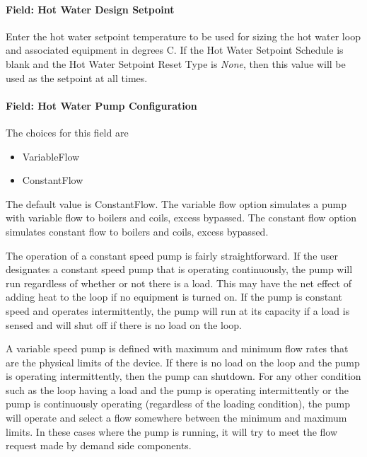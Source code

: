 \paragraph{Field: Hot Water Design Setpoint}\label{field-hot-water-design-setpoint}

Enter the hot water setpoint temperature to be used for sizing the hot water loop and associated equipment in degrees C. If the Hot Water Setpoint Schedule is blank and the Hot Water Setpoint Reset Type is \emph{None}, then this value will be used as the setpoint at all times.

\paragraph{Field: Hot Water Pump Configuration}\label{field-hot-water-pump-configuration}

The choices for this field are

\begin{itemize}
\item
  VariableFlow
\item
  ConstantFlow
\end{itemize}

The default value is ConstantFlow. The variable flow option simulates a pump with variable flow to boilers and coils, excess bypassed. The constant flow option simulates constant flow to boilers and coils, excess bypassed.

The operation of a constant speed pump is fairly straightforward. If the user designates a constant speed pump that is operating continuously, the pump will run regardless of whether or not there is a load. This may have the net effect of adding heat to the loop if no equipment is turned on. If the pump is constant speed and operates intermittently, the pump will run at its capacity if a load is sensed and will shut off if there is no load on the loop.

A variable speed pump is defined with maximum and minimum flow rates that are the physical limits of the device. If there is no load on the loop and the pump is operating intermittently, then the pump can shutdown. For any other condition such as the loop having a load and the pump is operating intermittently or the pump is continuously operating (regardless of the loading condition), the pump will operate and select a flow somewhere between the minimum and maximum limits. In these cases where the pump is running, it will try to meet the flow request made by demand side components.

